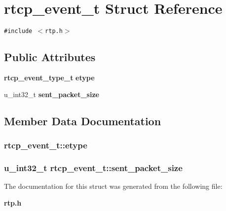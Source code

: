 \section{rtcp\_\-event\_\-t Struct Reference}
\label{structrtcp__event__t}
{\tt \#include $<$rtp.h$>$}

\subsection*{Public Attributes}
\begin{CompactItemize}
\item 
{\bf rtcp\_\-event\_\-type\_\-t} {\bf etype}
\item 
u\_\-int32\_\-t {\bf sent\_\-packet\_\-size}
\end{CompactItemize}


\subsection{Member Data Documentation}
\subsubsection{ {\bf rtcp\_\-event\_\-t::etype}}\label{structrtcp__event__t_o0}


\subsubsection{\setlength{\rightskip}{0pt plus 5cm}u\_\-int32\_\-t {\bf rtcp\_\-event\_\-t::sent\_\-packet\_\-size}}\label{structrtcp__event__t_o1}




The documentation for this struct was generated from the following file:\begin{CompactItemize}
\item 
{\bf rtp.h}\end{CompactItemize}
